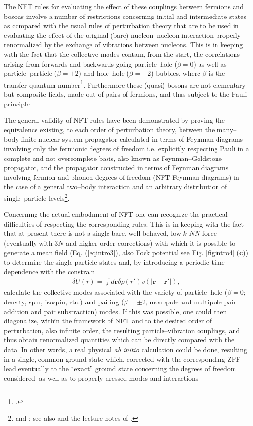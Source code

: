 The NFT rules  for evaluating the effect of these couplings between fermions and bosons involve a number of restrictions concerning initial and intermediate states as compared with the usual rules of perturbation theory that are to be used in evaluating the effect of the original (bare) nucleon--nucleon interaction properly renormalized by  the exchange of vibrations between nucleons. This is in keeping with the fact that the collective modes contain, from the start,  the correlations arising from forwards and backwards going  particle--hole ($\beta=0$) as well as particle--particle ($\beta=+2$) and hole--hole ($\beta=-2$) bubbles, where $\beta$ is the transfer quantum number\footnote{\cite{Bohr:64}.}. Furthermore  these (quasi) bosons are not elementary but composite fields, made out of pairs of fermions, and thus subject to the Pauli principle. 
 

The general validity of NFT rules have been demonstrated by proving the equivalence existing, to each order of perturbation theory, between the many--body finite nuclear system propagator calculated in terms of Feynman diagrams involving only the fermionic degrees of freedom i.e. explicitly respecting Pauli in a complete and not overcomplete basis, also known as Feynman--Goldstone propagator, and the propagator constructed in terms of Feynman diagrams involving fermion and phonon degrees of freedom (NFT Feynman diagrams) in the case of a general two--body interaction and an arbitrary distribution of single--particle levels\footnote{\cite{Bes:75} and \cite{Bes:76c}; see also \cite{Baranger:69} and the  lecture notes of  \cite{McFarlane:69}.}.



 Concerning the actual embodiment of NFT one can recognize the practical difficulties of respecting the corresponding rules. This is in keeping with the fact that at present there is not a single bare, well behaved, low-$k$ $NN$-force (eventually with 3$N$ and higher order corrections) with which it is possible to generate a mean field (Eq. (\ref{eqintro3}), also Fock potential see Fig. \ref{figintro4} (\textbf{c})) to determine the single-particle states and, by introducing a periodic time-dependence with the constrain
\begin{align}\label{eq1.5.1}
\delta U(r)=\int d\mathbf{r} \delta \rho(r') v(|\mathbf r- \mathbf r'|),
\end{align}
calculate the collective modes associated with the variety of particle--hole ($\beta=0$; density, spin, isospin, etc.) and pairing ($\beta=\pm2$; monopole and multipole pair addition and pair substraction) modes. If this was possible, one could then diagonalize, within the framework of NFT and to the desired order of perturbation, also infinite order, the resulting particle--vibration couplings, and thus obtain renormalized quantities which can be directly compared with the data.
 In other words, a real physical \textit{ab initio} calculation could be done, resulting in a single,  common ground state which, corrected with the corresponding  ZPF lead eventually to the ``exact'' ground state concerning the degrees of freedom considered, as well as to properly dressed modes and  interactions.



